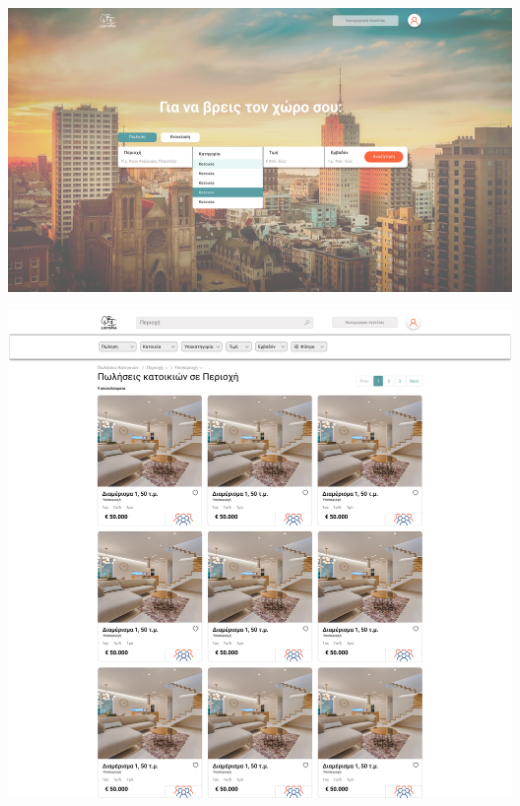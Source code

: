\documentclass{beamer}
\begin{document}
\begin{frame}
	\includegraphics[width=\textwidth]{"Home Page.png"}
\end{frame}

\begin{frame}
	\includegraphics[width=\textwidth]{"Listings.png"}
\end{frame}
\end{document}
